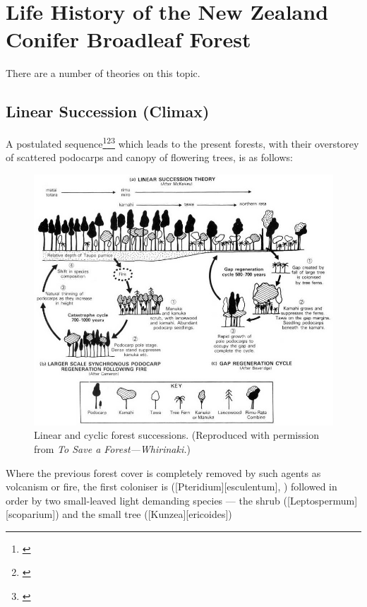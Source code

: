 \section{Life History of the New Zealand Conifer Broadleaf Forest}

There are a number of theories on this topic.

\subsection[Linear Succession (Climax)]{Linear Succession (Climax)}


A postulated sequence\footnote{\cite{cockayne1928vegetation}}\footnote{\cite{mckelvey1963synecology}}\footnote{\cite{mckelvey1973pattern}} which leads to the present forests, with their overstorey of scattered podocarps and canopy of flowering trees, is as follows:

\begin{figure}[!b]
	\centering
	\includegraphics[width=\textwidth]{graphics/figure64forestsuccession.jpg}
	\caption[Linear and cyclic forest successions]{Linear and cyclic forest successions. (Reproduced with permission from \emph{To Save a Forest---Whirinaki.})}%
	\label{fig:64forestsuccession}
\end{figure}

Where the previous forest cover is completely removed by such agents as volcanism or fire, the first coloniser is  ([Pteridium][esculentum], ) followed in order by two small-leaved light demanding species --- the shrub  ([Leptospermum][scoparium]) and the small tree  ([Kunzea][ericoides])

